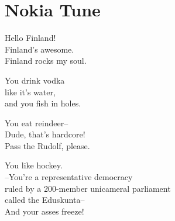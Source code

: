 \section{Nokia Tune}

Hello Finland!\\
Finland's awesome.\\
Finland rocks my soul.

You drink vodka\\
like it's water,\\
and you fish in holes.

You eat reindeer--\\
Dude, that's hardcore!\\
Pass the Rudolf, please.

You like hockey.\\
--You're a representative democracy\\
ruled by a 200-member unicameral parliament\\
called the Eduskunta--\\
And your asses freeze!